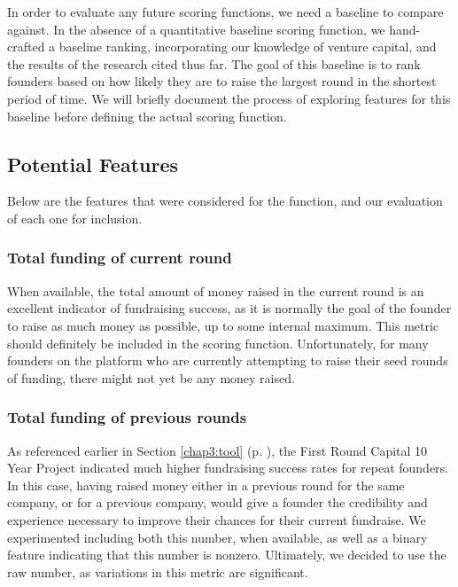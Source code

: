 In order to evaluate any future scoring functions, we need a baseline to compare against. In the absence of a quantitative baseline scoring function, we hand-crafted a baseline ranking, incorporating our knowledge of venture capital, and the results of the research cited thus far. The goal of this baseline is to rank founders based on how likely they are to raise the largest round in the shortest period of time. We will briefly document the process of exploring features for this baseline before defining the actual scoring function.

\subsection{Potential Features}

Below are the features that were considered for the function, and our evaluation of each one for inclusion.

\subsubsection{Total funding of current round}

When available, the total amount of money raised in the current round is an excellent indicator of fundraising success, as it is normally the goal of the founder to raise as much money as possible, up to some internal maximum. This metric should definitely be included in the scoring function. Unfortunately, for many founders on the platform who are currently attempting to raise their seed rounds of funding, there might not yet be any money raised.

\subsubsection{Total funding of previous rounds}

As referenced earlier in Section \ref{chap3:tool} (p. \pageref{chap3:tool}), the First Round Capital 10 Year Project \cite{first-round-10-years} indicated much higher fundraising success rates for repeat founders. In this case, having raised money either in a previous round for the same company, or for a previous company, would give a founder the credibility and experience necessary to improve their chances for their current fundraise. We experimented including both this number, when available, as well as a binary feature indicating that this number is nonzero. Ultimately, we decided to use the raw number, as variations in this metric are significant.


